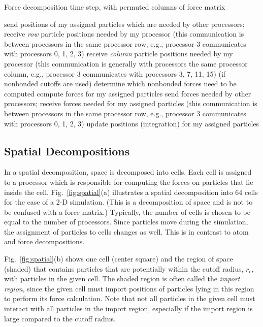 \begin{algorithm}
\caption{Force decomposition time step, with permuted columns of force matrix}
\label{alg:force2}
\begin{algorithmic}[1]
\STATE send positions of my assigned particles which are needed by
other processors; receive {\em row} particle positions needed by my processor
(this communication is between processors in the same processor row, e.g., processor
3 communicates with processors 0, 1, 2, 3)
\STATE receive {\em column} particle positions needed by my processor
(this communication is generally with processors the same processor column, e.g.,
processor 3 communicates with processors 3, 7, 11, 15)
\STATE (if nonbonded cutoffs are used) determine which nonbonded forces need to be computed
\STATE compute forces for my assigned particles
\STATE send forces needed by other processors; receive forces needed for my
assigned particles (this communication is between processors in the same 
processor row, e.g., processor 3 communicates with processors 0, 1, 2, 3)
\STATE update positions (integration) for my assigned particles
\end{algorithmic}
\end{algorithm}

\subsection{Spatial Decompositions}

In a spatial decomposition, space is decomposed into cells.
Each cell is assigned to a processor which is responsible
for computing the forces on particles that lie inside the cell.
Fig.~\ref{fig:spatial}(a) illustrates a spatial decomposition into 64 cells for the
case of a 2-D simulation.  (This is a decomposition of space and is
not to be confused with a force matrix.)  Typically, the number of cells
is chosen to be equal to the number of processors.
Since particles move during
the simulation, the assignment of particles to cells changes as well.
This is in contrast to atom and force decompositions.

Fig.~\ref{fig:spatial}(b) shows one cell (center square) and the region of space (shaded)
that contains particles that are potentially within the cutoff radius, $r_c$, with particles in 
the given cell.  The shaded region is often called the {\em import region}, since 
the given cell must import positions of particles lying in this region to 
perform its force calculation.  Note that 
not all particles in the given cell must interact with all particles in the import
region, especially if the import region is large compared to the cutoff radius.

